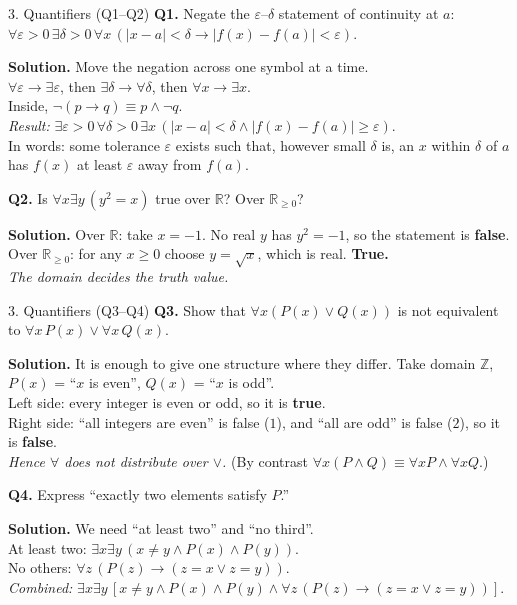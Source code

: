 \documentclass[aspectratio=169,10pt]{beamer}
\newcommand{\qa}[3]{%
  \textbf{Q#1.} #2\par\smallskip
  {\color{ans}\textbf{Solution.} #3}\par\vspace{6pt}}
\begin{document}
\begin{frame}{3. Quantifiers (Q1--Q2)}
\footnotesize
\qa{1}{Negate the $\varepsilon$--$\delta$ statement of continuity at $a$: $\forall\varepsilon>0\,\exists\delta>0\,\forall x\,(|x-a|<\delta\to|f(x)-f(a)|<\varepsilon)$.}
{Move the negation across one symbol at a time.\\
$\forall\varepsilon\to\exists\varepsilon$, then $\exists\delta\to\forall\delta$, then $\forall x\to\exists x$.\\
Inside, $\neg(p\to q)\equiv p\land\neg q$.\\
\emph{Result:} $\exists\varepsilon>0\,\forall\delta>0\,\exists x\,(|x-a|<\delta\land|f(x)-f(a)|\ge\varepsilon)$.\\
In words: some tolerance $\varepsilon$ exists such that, however small $\delta$ is, an $x$ within $\delta$ of $a$ has $f(x)$ at least $\varepsilon$ away from $f(a)$.}
\qa{2}{Is $\forall x\exists y\,(y^2=x)$ true over $\mathbb{R}$? Over $\mathbb{R}_{\ge0}$?}
{Over $\mathbb{R}$: take $x=-1$. No real $y$ has $y^2=-1$, so the statement is \textbf{false}.\\
Over $\mathbb{R}_{\ge0}$: for any $x\ge0$ choose $y=\sqrt x$, which is real. \textbf{True.}\\
\emph{The domain decides the truth value.}}
\end{frame}

\begin{frame}{3. Quantifiers (Q3--Q4)}
\footnotesize
\qa{3}{Show that $\forall x(P(x)\lor Q(x))$ is not equivalent to $\forall x\,P(x)\lor\forall x\,Q(x)$.}
{It is enough to give one structure where they differ. Take domain $\mathbb{Z}$, $P(x)$ = ``$x$ is even'', $Q(x)$ = ``$x$ is odd''.\\
Left side: every integer is even or odd, so it is \textbf{true}.\\
Right side: ``all integers are even'' is false ($1$), and ``all are odd'' is false ($2$), so it is \textbf{false}.\\
\emph{Hence $\forall$ does not distribute over $\lor$.} (By contrast $\forall x(P\land Q)\equiv\forall xP\land\forall xQ$.)}
\qa{4}{Express ``exactly two elements satisfy $P$.''}
{We need ``at least two'' and ``no third''.\\
At least two: $\exists x\exists y\,(x\ne y\land P(x)\land P(y))$.\\
No others: $\forall z\,(P(z)\to(z=x\lor z=y))$.\\
\emph{Combined:} $\exists x\exists y\,[x\ne y\land P(x)\land P(y)\land\forall z\,(P(z)\to(z=x\lor z=y))]$.}
\end{frame}
\end{document}
